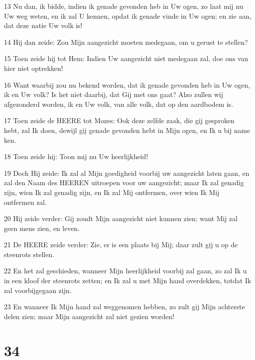 \par 13 Nu dan, ik bidde, indien ik genade gevonden heb in Uw ogen, zo laat mij nu Uw weg weten, en ik zal U kennen, opdat ik genade vinde in Uw ogen; en zie aan, dat deze natie Uw volk is!
\par 14 Hij dan zeide: Zou Mijn aangezicht moeten medegaan, om u gerust te stellen?
\par 15 Toen zeide hij tot Hem: Indien Uw aangezicht niet medegaan zal, doe ons van hier niet optrekken!
\par 16 Want waarbij zou nu bekend worden, dat ik genade gevonden heb in Uw ogen, ik en Uw volk? Is het niet daarbij, dat Gij met ons gaat? Alzo zullen wij afgezonderd worden, ik en Uw volk, van alle volk, dat op den aardbodem is.
\par 17 Toen zeide de HEERE tot Mozes: Ook deze zelfde zaak, die gij gesproken hebt, zal Ik doen, dewijl gij genade gevonden hebt in Mijn ogen, en Ik u bij name ken.
\par 18 Toen zeide hij: Toon mij nu Uw heerlijkheid!
\par 19 Doch Hij zeide: Ik zal al Mijn goedigheid voorbij uw aangezicht laten gaan, en zal den Naam des HEEREN uitroepen voor uw aangezicht; maar Ik zal genadig zijn, wien Ik zal genadig zijn, en Ik zal Mij ontfermen, over wien Ik Mij ontfermen zal.
\par 20 Hij zeide verder: Gij zoudt Mijn aangezicht niet kunnen zien; want Mij zal geen mens zien, en leven.
\par 21 De HEERE zeide verder: Zie, er is een plaats bij Mij; daar zult gij u op de steenrots stellen.
\par 22 En het zal geschieden, wanneer Mijn heerlijkheid voorbij zal gaan, zo zal Ik u in een kloof der steenrots zetten; en Ik zal u met Mijn hand overdekken, totdat Ik zal voorbijgegaan zijn.
\par 23 En wanneer Ik Mijn hand zal weggenomen hebben, zo zult gij Mijn achterste delen zien; maar Mijn aangezicht zal niet gezien worden!

\chapter{34}

